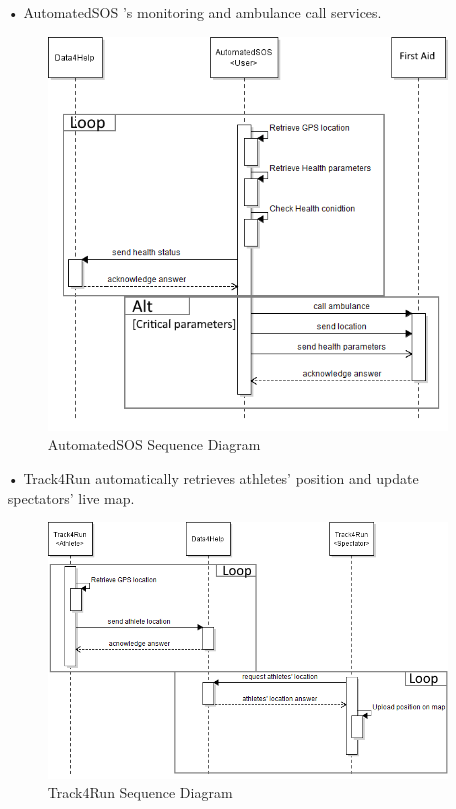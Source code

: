 \begin{enumerate}
\item[•]{\Large AutomatedSOS} 
's monitoring and ambulance call services.
\begin{figure}[H]
\centering
\includegraphics[scale=0.72]{Images/Seq_AutoSOS_monitor.png}
\caption{AutomatedSOS Sequence Diagram}
\end{figure}

\item[•]{\Large Track4Run} automatically retrieves athletes' position and update spectators' live map.
\begin{figure}[H]
\centering
\includegraphics[scale=0.72]{Images/Seq_Track4Run_raceUp.png}
\caption{Track4Run Sequence Diagram}
\end{figure}
\end{enumerate}


